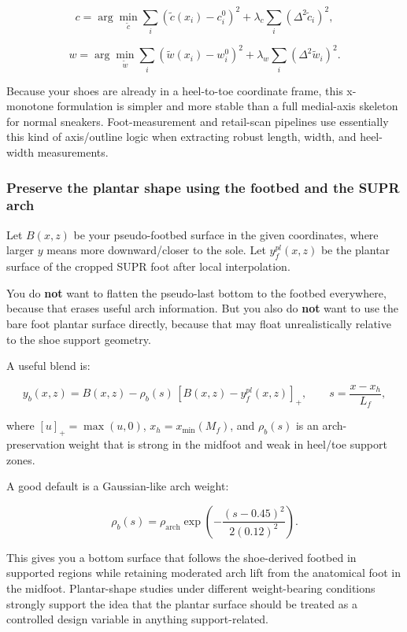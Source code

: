 \documentclass[
  10.5pt,
]{article}
\begin{document}
\[
c = \arg\min_{\tilde c}\sum_i \left(\tilde c(x_i)-c_i^0\right)^2 + \lambda_c \sum_i (\Delta^2 \tilde c_i)^2,
\]

\[
w = \arg\min_{\tilde w}\sum_i \left(\tilde w(x_i)-w_i^0\right)^2 + \lambda_w \sum_i (\Delta^2 \tilde w_i)^2.
\]

Because your shoes are already in a heel-to-toe coordinate frame, this
x-monotone formulation is simpler and more stable than a full
medial-axis skeleton for normal sneakers. Foot-measurement and
retail-scan pipelines use essentially this kind of axis/outline logic
when extracting robust length, width, and heel-width measurements.

\subsubsection{Preserve the plantar shape using the footbed and the SUPR
arch}\label{preserve-the-plantar-shape-using-the-footbed-and-the-supr-arch}

Let \(B(x,z)\) be your pseudo-footbed surface in the given coordinates,
where larger \(y\) means more downward/closer to the sole. Let
\(y_f^{pl}(x,z)\) be the plantar surface of the cropped SUPR foot after
local interpolation.

You do \textbf{not} want to flatten the pseudo-last bottom to the
footbed everywhere, because that erases useful arch information. But you
also do \textbf{not} want to use the bare foot plantar surface directly,
because that may float unrealistically relative to the shoe support
geometry.

A useful blend is:

\[
y_b(x,z) = B(x,z) - \rho_b(s)\,[B(x,z)-y_f^{pl}(x,z)]_+,
\qquad s=\frac{x-x_h}{L_f},
\]

where \([u]_+=\max(u,0)\), \(x_h=x_{\min}(M_f)\), and \(\rho_b(s)\) is
an arch-preservation weight that is strong in the midfoot and weak in
heel/toe support zones.

A good default is a Gaussian-like arch weight:

\[
\rho_b(s)=\rho_{\text{arch}}\exp\!\left(-\frac{(s-0.45)^2}{2(0.12)^2}\right).
\]

This gives you a bottom surface that follows the shoe-derived footbed in
supported regions while retaining moderated arch lift from the
anatomical foot in the midfoot. Plantar-shape studies under different
weight-bearing conditions strongly support the idea that the plantar
surface should be treated as a controlled design variable in anything
support-related.
\end{document}
